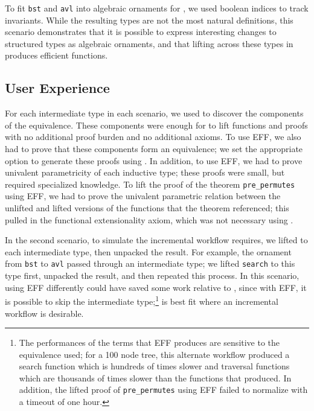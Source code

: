 To fit \lstinline{bst} and \lstinline{avl} into algebraic ornaments for \toolnameb,
we used boolean indices to track invariants.
While the resulting types are not the most natural definitions,
this scenario demonstrates that it is possible to express interesting changes to structured types as algebraic ornaments,
and that lifting across these types in \toolnameb produces efficient functions.

\subsection{User Experience}
\label{sec:caseuser}

For each intermediate type in each scenario, we used \toolnameb to 
discover the components of the equivalence.
These components
were enough for \toolnameb to lift functions and proofs 
with no additional proof burden and no additional axioms.
To use EFF, we also had to prove that these components form an equivalence;
we set the appropriate option to generate these proofs using \toolnameb.
In addition, to use EFF, we had to prove univalent parametricity of each inductive type;
these proofs were small, but required specialized knowledge.
To lift the proof of the theorem \lstinline{pre_permutes} using EFF, 
we had to prove the univalent parametric relation between the unlifted and lifted versions of the
functions that the theorem referenced; this pulled in the functional extensionality axiom, which was not necessary 
using \toolnameb.

In the second scenario, to simulate the incremental workflow \toolnameb requires, we lifted to each intermediate type, then unpacked the result.
For example, the ornament from \lstinline{bst} to \lstinline{avl} passed through an intermediate type;
we lifted \lstinline{search} to this type first, unpacked the result, and then repeated this process.
In this scenario, using EFF differently could have saved some work relative to \toolnameb, since with EFF, it is possible to skip 
the intermediate type;\footnote{The performances of the terms that EFF produces are sensitive to the equivalence used;
for a 100 node tree, this alternate workflow produced a search function
which is hundreds of times slower and traversal functions which are thousands of times slower
than the functions that \toolnameb produced. In addition, the lifted proof of \lstinline{pre_permutes} using EFF failed to normalize
with a timeout of one hour.}
\toolnameb is best fit where an incremental workflow is desirable.

